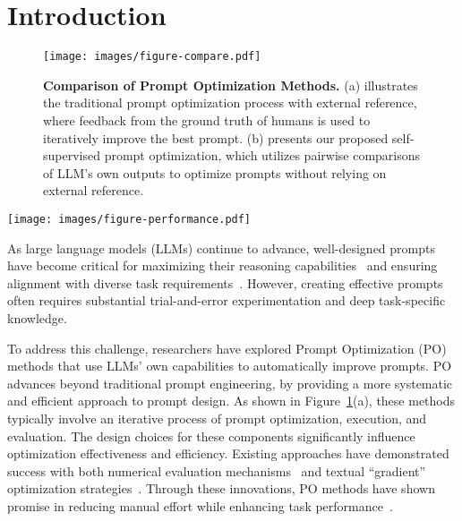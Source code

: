 \section{Introduction}

\begin{figure}[t!]
	\centering
\texttt{[image: images/figure-compare.pdf]}
        \vspace{-1em}
        \caption{\textbf{Comparison of Prompt Optimization Methods.} (a) illustrates the traditional prompt optimization process with external reference, where feedback from the ground truth of humans is used to iteratively improve the best prompt. (b) presents our proposed self-supervised prompt optimization, which utilizes pairwise comparisons of LLM's own outputs to optimize prompts without relying on external reference.}
	\label{fig:contrast}
\end{figure}

\begin{figure*}[t!]
	\centering
	\texttt{[image: images/figure-performance.pdf]}
        \vspace{-1em}
	\caption{\textbf{Comparison of Performance ($y$-axis) and Optimization Costs in Dollars ($x$-axis) across Six Prompt Optimization Methods.}
     \ours demonstrates competitive performance, consistently ranking among the top two methods while maintaining significantly lower costs (ranging from 1.1\% to 5.6\% of the costs incurred by other methods) across all datasets.
     }
    \label{fig:performance-cost}

\end{figure*}


As large language models (LLMs) continue to advance, well-designed prompts have become critical for maximizing their reasoning capabilities~\cite{wei2022COT, hua2024step, deng2023rephrase} and ensuring alignment with diverse task requirements~\cite{sirui2024meta, liu2024surveynl2sqllargelanguage, zhang2024mobileexperts, hong2024data}.
However, creating effective prompts often requires substantial trial-and-error experimentation and deep task-specific knowledge.


To address this challenge, researchers have explored Prompt Optimization (PO) methods that use LLMs' own capabilities to automatically improve prompts. PO advances beyond traditional prompt engineering, by providing a more systematic and efficient approach to prompt design. As shown in Figure~\ref{fig:contrast}(a), these methods typically involve an iterative process of prompt optimization, execution, and evaluation. The design choices for these components significantly influence optimization effectiveness and efficiency.
Existing approaches have demonstrated success with both numerical evaluation mechanisms~\cite{xin2024pa, yang2023opro, chris2024pb} and textual ``gradient'' optimization strategies~\cite{wang2024semantic, mert2024textgrad}. Through these innovations, PO methods have shown promise in reducing manual effort while enhancing task performance~\cite{reid2023protegi, zhang2024aflow, zhou2024zepo}.


